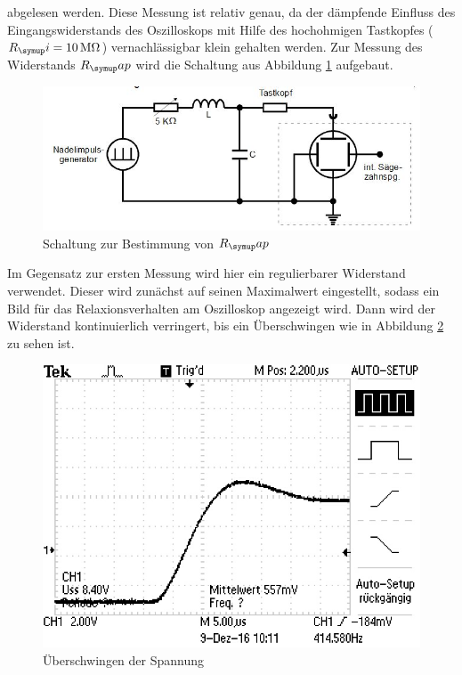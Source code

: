 abgelesen werden. Diese Messung ist relativ genau, da der dämpfende Einfluss
des Eingangswiderstands des Oszilloskops mit Hilfe des hochohmigen Tastkopfes
($R_\su{i}=10\,\si{\mega\ohm}$) vernachlässigbar klein gehalten werden.
Zur Messung des Widerstands $R_\su{ap}$ wird die Schaltung aus Abbildung
\ref{fig:rapschlt} aufgebaut. \\
\begin{figure}[h]
  \centering
  \includegraphics[width=\textwidth]{Bilder/RapSchalt.JPG}
  \caption{Schaltung zur Bestimmung von $R_\su{ap}$\,\cite{354}}
  \label{fig:rapschlt}
\end{figure}
Im Gegensatz zur ersten Messung wird hier ein regulierbarer Widerstand verwendet.
Dieser wird zunächst auf seinen Maximalwert eingestellt, sodass ein Bild
für das Relaxionsverhalten am Oszilloskop angezeigt wird. Dann wird der
Widerstand kontinuierlich verringert, bis ein Überschwingen wie in
Abbildung \ref{fig:aperid} zu sehen ist.
\begin{figure}[h]
  \centering
  \includegraphics{Bilder/aperid.JPG}
  \caption{Überschwingen der Spannung}
  \label{fig:aperid}
\end{figure} \\
